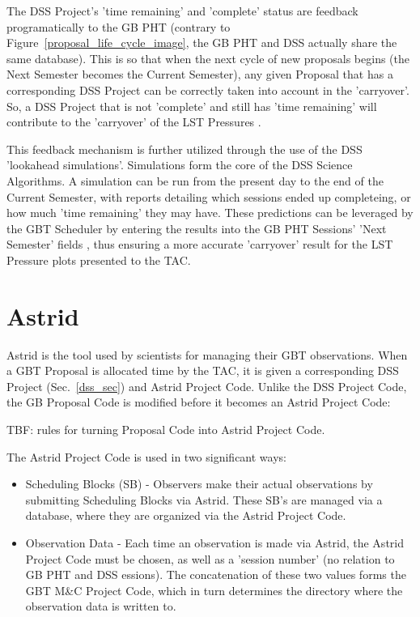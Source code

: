 \documentclass{article}
\begin{document}
The DSS Project's 'time remaining' and 'complete' status are feedback
programatically to the GB PHT (contrary to Figure~\ref{proposal_life_cycle_image}, the GB PHT and DSS actually share the same database).  This is so that when the next cycle of new
proposals begins (the Next Semester becomes the Current Semester), any given
Proposal that has a corresponding DSS Project can be correctly taken into
account in the 'carryover'.  So, a DSS Project that is not 'complete' and
still has 'time remaining' will contribute to the 'carryover' of the LST
Pressures \cite{marganian12b}.

This feedback mechanism is further utilized through the use of the DSS
'lookahead simulations'.  Simulations form the core of the DSS Science
Algorithms.  A simulation can be run from the present day to the end of the
Current Semester, with reports detailing which sessions ended up completeing,
or how much 'time remaining' they may have.  These predictions can be leveraged by the GBT Scheduler by entering the results into the GB PHT Sessions' 'Next Semester' fields \cite{marganian12a}, thus ensuring a more accurate 'carryover' result for the LST Pressure plots presented to the TAC.

\section{Astrid}\label{astrid_sec}

Astrid is the tool used by scientists for managing their GBT observations.
When a GBT Proposal is allocated time by the TAC, it is given a corresponding
DSS Project (Sec.~\ref{dss_sec}) and Astrid Project Code. Unlike the DSS Project
Code, the GB Proposal Code is modified before it becomes an Astrid Project
Code:

TBF: rules for turning Proposal Code into Astrid Project Code.

The Astrid Project Code is used in two significant ways:

\begin{itemize}
\item Scheduling Blocks (SB) - Observers make their actual observations by
submitting Scheduling Blocks via Astrid.  These SB's are managed via a
database, where they are organized via the Astrid Project Code.
\item Observation Data - Each time an observation is made via Astrid, the
Astrid Project Code must be chosen, as well as a 'session number' (no relation
to GB PHT and DSS essions).  The concatenation of these two values forms the
GBT M\&C Project Code, which in turn determines the directory where the
observation data is written to.
\end{itemize}
\end{document}
